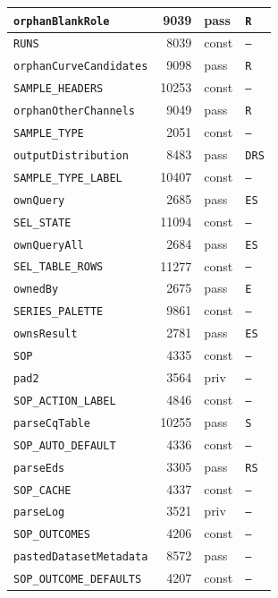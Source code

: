 {\begin{xltabular}{\linewidth}{|l|r|X|X|}
\texttt{orphanBlankRole} & 9039 & pass & \texttt{R} \\ \hline
\texttt{RUNS} & 8039 & const & \texttt{--} \\ \hline
\texttt{orphanCurveCandidates} & 9098 & pass & \texttt{R} \\ \hline
\texttt{SAMPLE\_HEADERS} & 10253 & const & \texttt{--} \\ \hline
\texttt{orphanOtherChannels} & 9049 & pass & \texttt{R} \\ \hline
\texttt{SAMPLE\_TYPE} & 2051 & const & \texttt{--} \\ \hline
\texttt{outputDistribution} & 8483 & pass & \texttt{DRS} \\ \hline
\texttt{SAMPLE\_TYPE\_LABEL} & 10407 & const & \texttt{--} \\ \hline
\texttt{ownQuery} & 2685 & pass & \texttt{ES} \\ \hline
\texttt{SEL\_STATE} & 11094 & const & \texttt{--} \\ \hline
\texttt{ownQueryAll} & 2684 & pass & \texttt{ES} \\ \hline
\texttt{SEL\_TABLE\_ROWS} & 11277 & const & \texttt{--} \\ \hline
\texttt{ownedBy} & 2675 & pass & \texttt{E} \\ \hline
\texttt{SERIES\_PALETTE} & 9861 & const & \texttt{--} \\ \hline
\texttt{ownsResult} & 2781 & pass & \texttt{ES} \\ \hline
\texttt{SOP} & 4335 & const & \texttt{--} \\ \hline
\texttt{pad2} & 3564 & priv & \texttt{--} \\ \hline
\texttt{SOP\_ACTION\_LABEL} & 4846 & const & \texttt{--} \\ \hline
\texttt{parseCqTable} & 10255 & pass & \texttt{S} \\ \hline
\texttt{SOP\_AUTO\_DEFAULT} & 4336 & const & \texttt{--} \\ \hline
\texttt{parseEds} & 3305 & pass & \texttt{RS} \\ \hline
\texttt{SOP\_CACHE} & 4337 & const & \texttt{--} \\ \hline
\texttt{parseLog} & 3521 & priv & \texttt{--} \\ \hline
\texttt{SOP\_OUTCOMES} & 4206 & const & \texttt{--} \\ \hline
\texttt{pastedDatasetMetadata} & 8572 & pass & \texttt{--} \\ \hline
\texttt{SOP\_OUTCOME\_DEFAULTS} & 4207 & const & \texttt{--} \\ \hline

\end{xltabular}}
